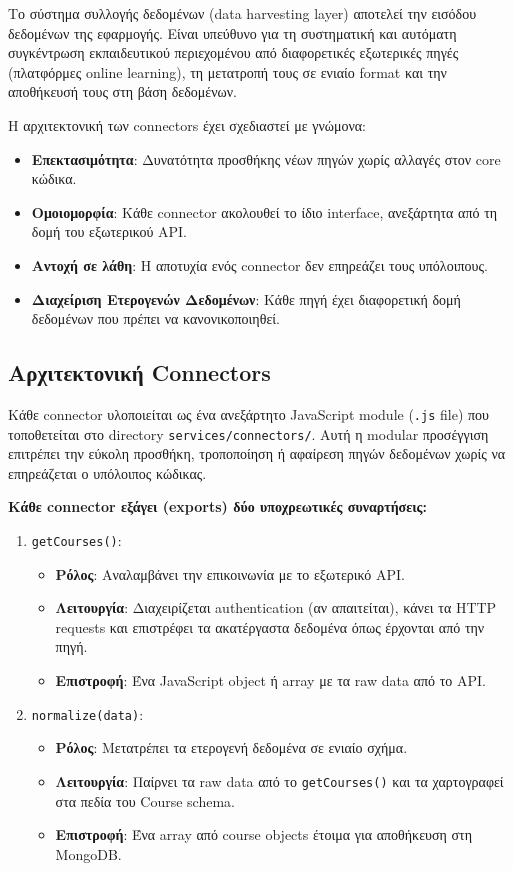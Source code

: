 \documentclass[a4paper,12pt]{article}
\begin{document}
Το σύστημα συλλογής δεδομένων (data harvesting layer) αποτελεί την εισόδου δεδομένων της εφαρμογής. Είναι υπεύθυνο για τη συστηματική και αυτόματη συγκέντρωση εκπαιδευτικού περιεχομένου από διαφορετικές εξωτερικές πηγές (πλατφόρμες online learning), τη μετατροπή τους σε ενιαίο format και την αποθήκευσή τους στη βάση δεδομένων.

Η αρχιτεκτονική των connectors έχει σχεδιαστεί με γνώμονα:
\begin{itemize}
    \item \textbf{Επεκτασιμότητα}: Δυνατότητα προσθήκης νέων πηγών χωρίς αλλαγές στον core κώδικα.
    \item \textbf{Ομοιομορφία}: Κάθε connector ακολουθεί το ίδιο interface, ανεξάρτητα από τη δομή του εξωτερικού API.
    \item \textbf{Αντοχή σε λάθη}: Η αποτυχία ενός connector δεν επηρεάζει τους υπόλοιπους.
    \item \textbf{Διαχείριση Ετερογενών Δεδομένων}: Κάθε πηγή έχει διαφορετική δομή δεδομένων που πρέπει να κανονικοποιηθεί.
\end{itemize}

\subsection{Αρχιτεκτονική Connectors}

Κάθε connector υλοποιείται ως ένα ανεξάρτητο JavaScript module (\texttt{.js} file) που τοποθετείται στο directory \texttt{services/connectors/}. Αυτή η modular προσέγγιση επιτρέπει την εύκολη προσθήκη, τροποποίηση ή αφαίρεση πηγών δεδομένων χωρίς να επηρεάζεται ο υπόλοιπος κώδικας.

\textbf{Κάθε connector εξάγει (exports) δύο υποχρεωτικές συναρτήσεις:}

\begin{enumerate}
    \item \texttt{getCourses()}: 
    \begin{itemize}
        \item \textbf{Ρόλος}: Αναλαμβάνει την επικοινωνία με το εξωτερικό API.
        \item \textbf{Λειτουργία}: Διαχειρίζεται authentication (αν απαιτείται), κάνει τα HTTP requests και επιστρέφει τα ακατέργαστα δεδομένα όπως έρχονται από την πηγή.
        \item \textbf{Επιστροφή}: Ένα JavaScript object ή array με τα raw data από το API.
    \end{itemize}
    
    \item \texttt{normalize(data)}:
    \begin{itemize}
        \item \textbf{Ρόλος}: Μετατρέπει τα ετερογενή δεδομένα σε ενιαίο σχήμα.
        \item \textbf{Λειτουργία}: Παίρνει τα raw data από το \texttt{getCourses()} και τα χαρτογραφεί στα πεδία του Course schema.
        \item \textbf{Επιστροφή}: Ένα array από course objects έτοιμα για αποθήκευση στη MongoDB.
    \end{itemize}
\end{enumerate}
\end{document}
